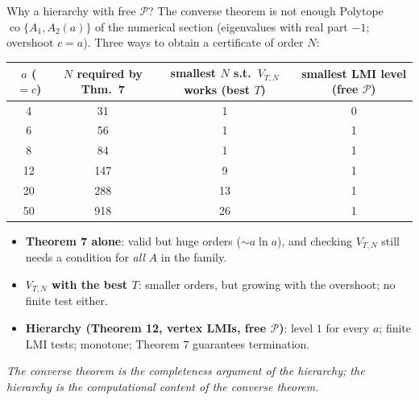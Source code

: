 \documentclass[10pt,aspectratio=169]{beamer}
\newcommand{\PP}{\mathcal{P}}
\DeclareMathOperator{\co}{co}
\begin{document}
\begin{frame}{Why a hierarchy with free $\PP$? The converse theorem is not enough}
\small Polytope $\co\{A_1,A_2(a)\}$ of the numerical section (eigenvalues with real part $-1$; overshoot $c=a$). Three ways to obtain a certificate of order $N$:
\begin{center}
\begin{tabular}{cccc}\toprule
$a$ ($=c$) & $N$ required by Thm.\ 7 & smallest $N$ s.t.\ $V_{T,N}$ works (best $T$) & smallest LMI level (free $\PP$)\\\midrule
4 & 31 & 1 & 0\\
6 & 56 & 1 & 1\\
8 & 84 & 1 & 1\\
12 & 147 & 9 & 1\\
20 & 288 & 13 & 1\\
50 & 918 & 26 & 1\\\bottomrule
\end{tabular}
\end{center}
\begin{itemize}
\item \textbf{Theorem 7 alone}: valid but huge orders ($\sim a\ln a$), and checking $V_{T,N}$ still needs a condition for \emph{all} $A$ in the family.
\item \textbf{$V_{T,N}$ with the best $T$}: smaller orders, but growing with the overshoot; no finite test either.
\item \textbf{Hierarchy (Theorem 12, vertex LMIs, free $\PP$)}: level $1$ for every $a$; finite LMI tests; monotone; Theorem 7 guarantees termination.
\end{itemize}
\medskip
\emph{The converse theorem is the completeness argument of the hierarchy; the hierarchy is the computational content of the converse theorem.}
\end{frame}
\end{document}
